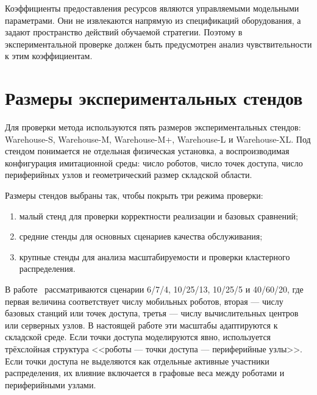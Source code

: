 Коэффициенты предоставления ресурсов являются управляемыми модельными параметрами. Они не извлекаются напрямую из спецификаций оборудования, а задают пространство действий обучаемой стратегии. Поэтому в экспериментальной проверке должен быть предусмотрен анализ чувствительности к этим коэффициентам.

\section{Размеры экспериментальных стендов}\label{sec:ch6_stand_sizes}

Для проверки метода используются пять размеров экспериментальных стендов: Warehouse-S, Warehouse-M, Warehouse-M+, Warehouse-L и Warehouse-XL. Под стендом понимается не отдельная физическая установка, а воспроизводимая конфигурация имитационной среды: число роботов, число точек доступа, число периферийных узлов и геометрический размер складской области.

Размеры стендов выбраны так, чтобы покрыть три режима проверки:
\begin{enumerate}
	\item малый стенд для проверки корректности реализации и базовых сравнений;
	\item средние стенды для основных сценариев качества обслуживания;
	\item крупные стенды для анализа масштабируемости и проверки кластерного распределения.
\end{enumerate}

В работе~\cite{Baruffa2025AMRResourceAssignment} рассматриваются сценарии 6/7/4, 10/25/13, 10/25/5 и 40/60/20, где первая величина соответствует числу мобильных роботов, вторая --- числу базовых станций или точек доступа, третья --- числу вычислительных центров или серверных узлов. В настоящей работе эти масштабы адаптируются к складской среде. Если точки доступа моделируются явно, используется трёхслойная структура <<роботы --- точки доступа --- периферийные узлы>>. Если точки доступа не выделяются как отдельные активные участники распределения, их влияние включается в графовые веса между роботами и периферийными узлами.


